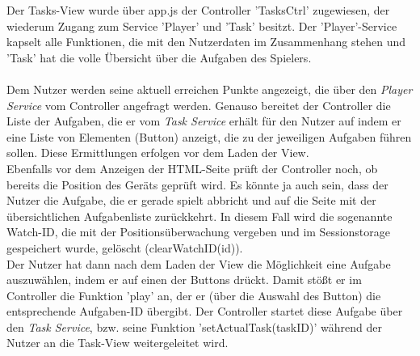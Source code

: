 Der Tasks-View wurde über app.js der Controller 'TasksCtrl' zugewiesen, der wiederum Zugang zum Service 'Player' und 'Task' besitzt. Der 'Player'-Service kapselt alle Funktionen, die mit den Nutzerdaten im Zusammenhang stehen und 'Task' hat die volle Übersicht über die Aufgaben des Spielers.
\\
\\
Dem Nutzer werden seine aktuell erreichen Punkte angezeigt, die über den \emph{Player Service} vom Controller angefragt werden. Genauso bereitet der Controller die Liste der Aufgaben, die er vom \emph{Task Service} erhält für den Nutzer auf indem er eine Liste von Elementen (Button) anzeigt, die zu der jeweiligen Aufgaben führen sollen. Diese Ermittlungen erfolgen vor dem Laden der View.
\\
Ebenfalls vor dem Anzeigen der HTML-Seite prüft der Controller noch, ob bereits die Position des Geräts geprüft wird. Es könnte ja auch sein, dass der Nutzer die Aufgabe, die er gerade spielt abbricht und auf die Seite mit der übersichtlichen Aufgabenliste zurückkehrt. In diesem Fall wird die sogenannte Watch-ID, die mit der Positionsüberwachung vergeben und im Sessionstorage gespeichert wurde, gelöscht (clearWatchID(id)).
\\
Der Nutzer hat dann nach dem Laden der View die Möglichkeit eine Aufgabe auszuwählen, indem er auf einen der Buttons drückt. Damit stößt er im Controller die Funktion 'play' an, der er (über die Auswahl des Button) die entsprechende Aufgaben-ID übergibt. Der Controller startet diese Aufgabe über den \emph{Task Service}, bzw. seine Funktion 'setActualTask(taskID)' während der Nutzer an die Task-View weitergeleitet wird.
